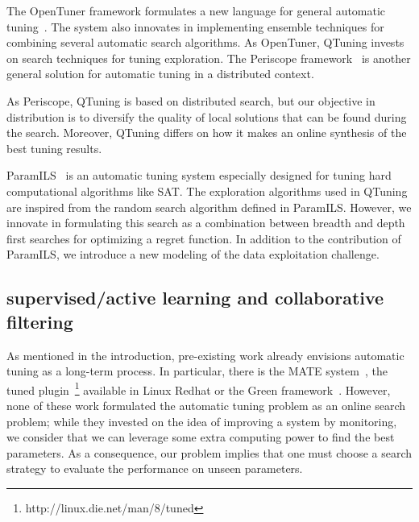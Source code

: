 \documentclass[10pt, conference, compsocconf]{IEEEtran}
\begin{document}

The OpenTuner framework formulates a new language for general automatic
tuning~\cite{DBLP:conf/IEEEpact/AnselKVRBOA14}.  The system also innovates in
implementing ensemble techniques for combining several automatic search
algorithms. As OpenTuner, QTuning invests on search techniques for tuning
exploration. The Periscope framework~\cite{DBLP:conf/parco/MijakovicSUGSC13} is
another general solution for automatic tuning in a distributed context. 


As Periscope, QTuning is based on distributed search, but
our objective in distribution is to diversify the quality of local solutions
that can be found during the search. Moreover, QTuning differs on how it makes
an online synthesis of the best tuning results.

ParamILS~\cite{Hutter:2009:PAA:1734953.1734959} is an automatic tuning system
especially designed for tuning hard computational algorithms like SAT. The
exploration algorithms used in QTuning are inspired from the random search
algorithm defined in ParamILS. However, we innovate in formulating this search
as a combination between breadth and depth first searches for optimizing a
regret function. In addition to the contribution of ParamILS, we introduce a
new modeling of the data exploitation challenge.

\subsection{supervised/active learning and collaborative filtering}

As mentioned in the introduction, pre-existing work already envisions automatic
tuning as a long-term process. In particular, there is the MATE
system~\cite{DBLP:conf/para/MorajkoMCMS10}, the tuned
plugin~\footnote{http://linux.die.net/man/8/tuned} available in Linux Redhat or
the Green framework~\cite{Baek:2010:GFS:1809028.1806620}. However, none of
these work formulated the automatic tuning problem as an online search
problem; while they invested on the idea of improving a system by monitoring,
we consider that we can leverage some extra computing power to find the best
parameters. As a consequence, our problem implies that one must choose a
search strategy to evaluate the performance on unseen parameters.
\end{document}
